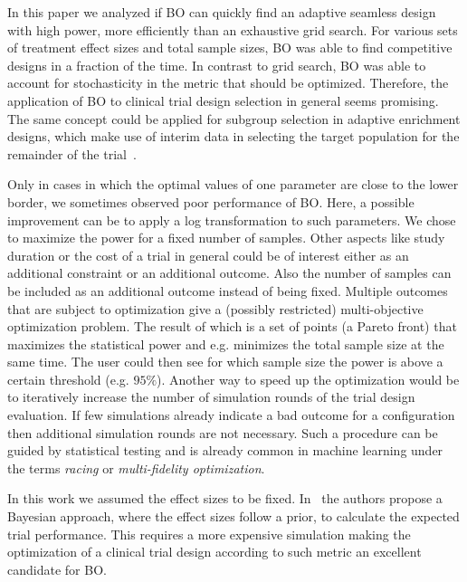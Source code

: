 \documentclass[bimj,fleqn]{w-art}
\theoremstyle{plain}
\theoremstyle{definition}
\begin{document}
In this paper we analyzed if BO can quickly find an adaptive seamless design with high power, more efficiently than an exhaustive grid search.
For various sets of treatment effect sizes and total sample sizes, BO was able to find competitive designs in a fraction of the time.
In contrast to grid search, BO was able to account for stochasticity in the metric that should be optimized.
Therefore, the application of BO to clinical trial design selection in general seems promising. 
The same concept could be applied for subgroup selection in adaptive enrichment designs, which make use of interim data in selecting the target population for the remainder of the trial~\citep{burnett_adaptive_2020}.

Only in cases in which the optimal values of one parameter are close to the lower border, we sometimes observed poor performance of BO.
Here, a possible improvement can be to apply a log transformation to such parameters. %
We chose to maximize the power for a fixed number of samples.
Other aspects like study duration or the cost of a trial in general could be of interest either as an additional constraint or an additional outcome.
Also the number of samples can be included as an additional outcome instead of being fixed.
Multiple outcomes that are subject to optimization give a (possibly restricted) multi-objective optimization problem.
The result of which is a set of points (a Pareto front) that maximizes the statistical power and e.g. minimizes the total sample size at the same time.
The user could then see for which sample size the power is above a certain threshold (e.g. $95\%$).
Another way to speed up the optimization would be to iteratively increase the number of simulation rounds of the trial design evaluation. 
If few simulations already indicate a bad outcome for a configuration then additional simulation rounds are not necessary.
Such a procedure can be guided by statistical testing and is already common in machine learning under the terms \emph{racing} or \emph{multi-fidelity optimization}.


In this work we assumed the effect sizes to be fixed. %
In~\citet{stallard_optimal_2009} the authors propose a Bayesian approach, where the effect sizes follow a prior, to calculate the expected trial performance.
This requires a more expensive simulation making the optimization of a clinical trial design according to such metric an excellent candidate for BO.
\end{document}
